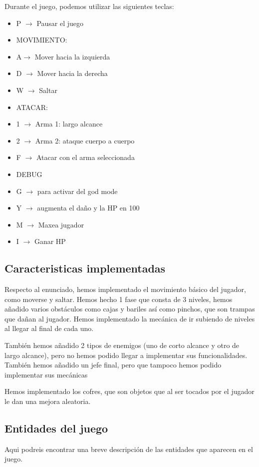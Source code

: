 \documentclass{article}
\begin{document}
    Durante el juego, podemos utilizar las siguientes teclas:

    \begin{itemize}
        \item P $\rightarrow$ Pausar el juego
        \item MOVIMIENTO:
        \item A$\rightarrow$ Mover hacia la izquierda
        \item D $\rightarrow$ Mover hacia la derecha
        \item W $\rightarrow$ Saltar
        \item ATACAR:
        \item 1 $\rightarrow$ Arma 1: largo alcance
        \item 2 $\rightarrow$ Arma 2: ataque cuerpo a cuerpo
        \item F $\rightarrow$ Atacar con el arma seleccionada
        \item DEBUG
        \item G $\rightarrow$ para activar del god mode
        \item Y $\rightarrow$ augmenta el daño y la HP en 100
        \item M $\rightarrow$ Maxea jugador
        \item I $\rightarrow$ Ganar HP
    \end{itemize}
\subsection{Caracteristicas implementadas}
    Respecto al enunciado, hemos implementado el movimiento básico del jugador, como moverse y saltar.
    Hemos hecho 1 fase que consta de 3 niveles, hemos añadido varios obstáculos como cajas y bariles así como pinchos, que son trampas que dañan al jugador. 
    Hemos implementado la mecánica de ir subiendo de niveles al llegar al final de cada uno. 

    También hemos añadido 2 tipos de enemigos (uno de corto alcance y otro de largo alcance), pero no hemos podido llegar a implementar sus funcionalidades. 
    También hemos añadido un jefe final, pero que tampoco hemos podido implementar sus mecánicas

    Hemos implementado los cofres, que son objetos que al ser tocados por el jugador le dan una mejora aleatoria.
\subsection{Entidades del juego}
    Aqui podreis encontrar una breve descripción de las entidades que aparecen en el juego.
\end{document}
